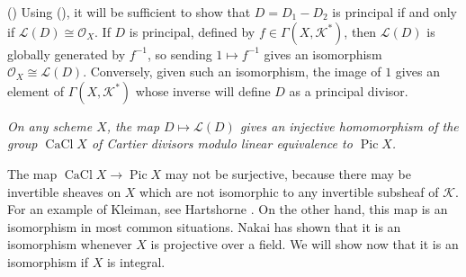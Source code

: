 {() Using (), it will be sufficient to show that $D=D_1-D_2$ is principal if and only if $\mathcal L(D)\cong\mathcal O_X$. If $D$ is principal, defined by $f\in\Gamma(X,\mathcal K^*)$, then $\mathcal L(D)$ is globally generated by $f^{-1}$, so sending $1\mapsto f^{-1}$ gives an isomorphism $\mathcal O_X\cong\mathcal L(D)$. Conversely, given such an isomorphism, the image of $1$ gives an element of $\Gamma(X,\mathcal K^*)$ whose inverse will define $D$ as a principal divisor.

 \emph{On any scheme $X$, the map $D\mapsto\mathcal L(D)$ gives an injective homomorphism of the group $\operatorname{CaCl}X$ of Cartier divisors modulo linear equivalence to $\operatorname{Pic}X$.}

 The map $\operatorname{CaCl}X\to\operatorname{Pic}X$ may not be surjective, because there may be invertible sheaves on $X$ which are not isomorphic to any invertible subsheaf of $\mathcal K$. For an example of Kleiman, see Hartshorne . On the other hand, this map is an isomorphism in most common situations. Nakai  has shown that it is an isomorphism whenever $X$ is projective over a field. We will show now that it is an isomorphism if $X$ is integral.
}
